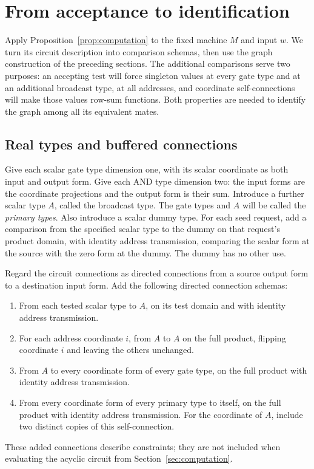 \section{From acceptance to identification}
\label{sec:identification}

Apply Proposition~\ref{prop:computation} to the fixed machine \(M\) and input
\(w\).  We turn its circuit description into comparison schemas, then use the
graph construction of the preceding sections.  The additional comparisons
serve two purposes: an accepting test will force singleton values at every
gate type and at an additional broadcast type, at all addresses, and coordinate
self-connections will make those values row-sum functions.  Both properties
are needed to identify the graph among all its equivalent mates.

\subsection{Real types and buffered connections}

Give each scalar gate type dimension one, with its scalar coordinate as both
input and output form.  Give each AND type dimension two: the input forms are
the coordinate projections and the output form is their sum.  Introduce a
further scalar type \(A\), called the broadcast type.  The gate types and
\(A\) will be called the \emph{primary types}.  Also introduce a scalar dummy
type.  For each seed request, add a comparison from the specified scalar
type to the dummy on that request's product domain, with identity address
transmission, comparing the scalar form at the source with the zero form at
the dummy.  The dummy has no other use.

Regard the circuit connections as directed connections from a source output
form to a destination input form.  Add the following directed connection
schemas:
\begin{enumerate}
\item From each tested scalar type to \(A\), on its test domain and with
identity address transmission.
\item For each address coordinate \(i\), from \(A\) to \(A\) on the full
product, flipping coordinate \(i\) and leaving the others unchanged.
\item From \(A\) to every coordinate form of every gate type, on the full
product with identity address transmission.
\item From every coordinate form of every primary type to itself, on the full
product with identity address transmission.  For the coordinate of \(A\),
include two distinct copies of this self-connection.
\end{enumerate}
These added connections describe constraints; they are not included when
evaluating the acyclic circuit from Section~\ref{sec:computation}.


